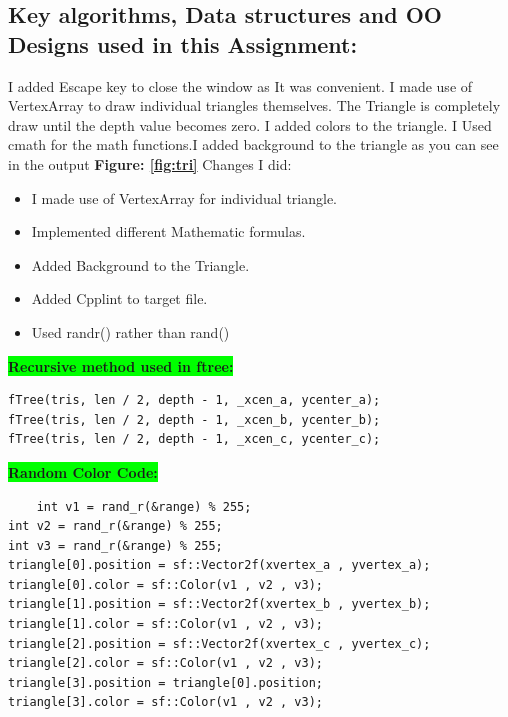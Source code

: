 \subsection{Key algorithms, Data structures and OO Designs used in this Assignment:}\label{sec:ps2:kdo}
    I added Escape key to close the window as It was convenient.
    I made use of VertexArray to draw individual triangles themselves.
    The Triangle is completely draw until the depth value becomes zero.
    I added colors to the triangle.
    I Used cmath for the math functions.I added background to the triangle as you can see in the output \textbf{Figure: \ref{fig:tri}}
    \newline Changes I did: \newline
    \begin{itemize}
        \item   I made use of VertexArray for individual triangle.
\item  Implemented different Mathematic formulas.
\item  Added Background to the Triangle.
\item  Added Cpplint to target file.
\item  Used randr() rather than rand()
    \end{itemize}
    \textbf{\colorbox{lime}{Recursive method used in ftree:}} 
    \begin{lstlisting}
fTree(tris, len / 2, depth - 1, _xcen_a, ycenter_a);
fTree(tris, len / 2, depth - 1, _xcen_b, ycenter_b);
fTree(tris, len / 2, depth - 1, _xcen_c, ycenter_c);
    \end{lstlisting}
    \textbf{\colorbox{lime}{Random Color Code:}}
    \begin{lstlisting}
    int v1 = rand_r(&range) % 255;
int v2 = rand_r(&range) % 255;
int v3 = rand_r(&range) % 255;
triangle[0].position = sf::Vector2f(xvertex_a , yvertex_a);
triangle[0].color = sf::Color(v1 , v2 , v3);
triangle[1].position = sf::Vector2f(xvertex_b , yvertex_b);
triangle[1].color = sf::Color(v1 , v2 , v3);
triangle[2].position = sf::Vector2f(xvertex_c , yvertex_c);
triangle[2].color = sf::Color(v1 , v2 , v3);
triangle[3].position = triangle[0].position;
triangle[3].color = sf::Color(v1 , v2 , v3);
    \end{lstlisting}
    \newpage

